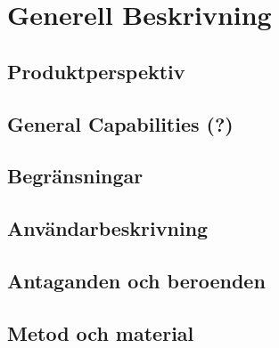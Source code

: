 \section{Generell Beskrivning}

\subsection{Produktperspektiv}

\subsection{General Capabilities (?)}

\subsection{Begränsningar}

\subsection{Användarbeskrivning}

\subsection{Antaganden och beroenden}

\subsection{Metod och material}